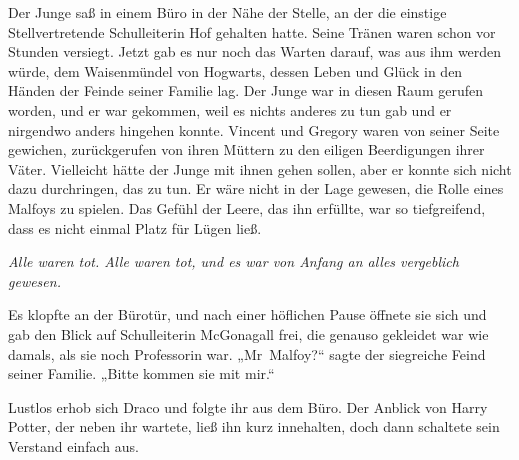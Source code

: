 Der Junge saß in einem Büro in der Nähe der Stelle, an der die einstige Stellvertretende Schulleiterin Hof gehalten hatte. Seine Tränen waren schon vor Stunden versiegt. Jetzt gab es nur noch das Warten darauf, was aus ihm werden würde, dem Waisenmündel von Hogwarts, dessen Leben und Glück in den Händen der Feinde seiner Familie lag. Der Junge war in diesen Raum gerufen worden, und er war gekommen, weil es nichts anderes zu tun gab und er nirgendwo anders hingehen konnte. Vincent und Gregory waren von seiner Seite gewichen, zurückgerufen von ihren Müttern zu den eiligen Beerdigungen ihrer Väter. Vielleicht hätte der Junge mit ihnen gehen sollen, aber er konnte sich nicht dazu durchringen, das zu tun. Er wäre nicht in der Lage gewesen, die Rolle eines Malfoys zu spielen. Das Gefühl der Leere, das ihn erfüllte, war so tiefgreifend, dass es nicht einmal Platz für Lügen ließ.

\emph{Alle waren tot. Alle waren tot, und es war von Anfang an alles vergeblich gewesen.}

Es klopfte an der Bürotür, und nach einer höflichen Pause öffnete sie sich und gab den Blick auf Schulleiterin McGonagall frei, die genauso gekleidet war wie damals, als sie noch Professorin war.
„Mr~Malfoy?“ sagte der siegreiche Feind seiner Familie.
„Bitte kommen sie mit mir.“

Lustlos erhob sich Draco und folgte ihr aus dem Büro. Der Anblick von Harry Potter, der neben ihr wartete, ließ ihn kurz innehalten, doch dann schaltete sein Verstand einfach aus.

